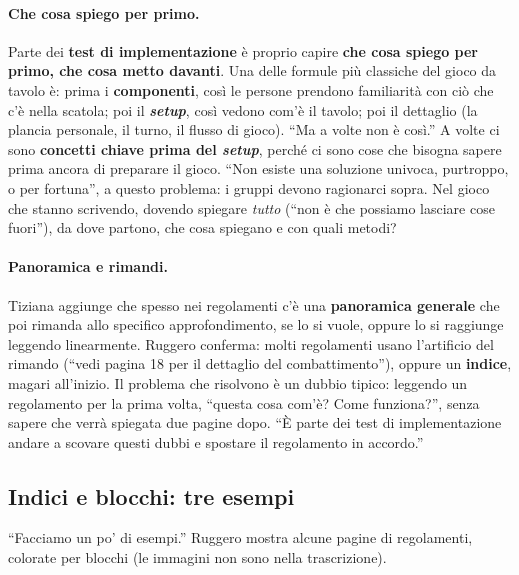 \paragraph{Che cosa spiego per primo.} Parte dei \textbf{test di implementazione} è
proprio capire \textbf{che cosa spiego per primo, che cosa metto davanti}. Una delle
formule più classiche del gioco da tavolo è: prima i \textbf{componenti}, così le persone
prendono familiarità con ciò che c'è nella scatola; poi il \textbf{\emph{setup}}, così
vedono com'è il tavolo; poi il dettaglio (la plancia personale, il turno, il flusso di
gioco). ``Ma a volte non è così.'' A volte ci sono \textbf{concetti chiave prima del
\emph{setup}}, perché ci sono cose che bisogna sapere prima ancora di preparare il gioco.
``Non esiste una soluzione univoca, purtroppo, o per fortuna'', a questo problema: i
gruppi devono ragionarci sopra. Nel gioco che stanno scrivendo, dovendo spiegare
\emph{tutto} (``non è che possiamo lasciare cose fuori''), da dove partono, che cosa
spiegano e con quali metodi?

\paragraph{Panoramica e rimandi.} Tiziana aggiunge che spesso nei regolamenti c'è una
\textbf{panoramica generale} che poi rimanda allo specifico approfondimento, se lo si
vuole, oppure lo si raggiunge leggendo linearmente. Ruggero conferma: molti regolamenti
usano l'artificio del rimando (``vedi pagina 18 per il dettaglio del combattimento''),
oppure un \textbf{indice}, magari all'inizio. Il problema che risolvono è un dubbio
tipico: leggendo un regolamento per la prima volta, ``questa cosa com'è? Come
funziona?'', senza sapere che verrà spiegata due pagine dopo. ``È parte dei test di
implementazione andare a scovare questi dubbi e spostare il regolamento in accordo.''

\subsection{Indici e blocchi: tre esempi}



``Facciamo un po' di esempi.'' Ruggero mostra alcune pagine di regolamenti, colorate per
blocchi (le immagini non sono nella trascrizione).

